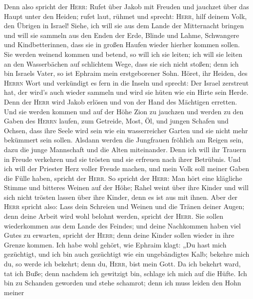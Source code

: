  Denn also spricht der \textsc{Herr}: Rufet über Jakob mit
Freuden und jauchzet über das Haupt unter den Heiden; rufet laut, rühmet
und sprecht: \textsc{Herr}, hilf deinem Volk, den Übrigen in Israel!
 Siehe, ich will sie aus dem Lande der Mitternacht bringen
und will sie sammeln aus den Enden der Erde, Blinde und Lahme,
Schwangere und Kindbetterinnen, dass sie in großen Haufen wieder hierher
kommen sollen.  Sie werden weinend kommen und betend, so
will ich sie leiten; ich will sie leiten an den Wasserbächen auf
schlichtem Wege, dass sie sich nicht stoßen; denn ich bin Israels Vater,
so ist Ephraim mein erstgeborener Sohn.  Höret, ihr
Heiden, des \textsc{Herrn} Wort und verkündigt es fern in die Inseln und
sprecht: Der Israel zerstreut hat, der wird's auch wieder sammeln und
wird sie hüten wie ein Hirte sein Herde.  Denn der
\textsc{Herr} wird Jakob erlösen und von der Hand des Mächtigen
erretten.  Und sie werden kommen und auf der Höhe Zion zu
jauchzen und werden zu den Gaben des \textsc{Herrn} laufen, zum
Getreide, Most, Öl, und jungen Schafen und Ochsen, dass ihre Seele wird
sein wie ein wasserreicher Garten und sie nicht mehr bekümmert sein
sollen.  Alsdann werden die Jungfrauen fröhlich am Reigen
sein, dazu die junge Mannschaft und die Alten miteinander. Denn ich will
ihr Trauern in Freude verkehren und sie trösten und sie erfreuen nach
ihrer Betrübnis.  Und ich will der Priester Herz voller
Freude machen, und mein Volk soll meiner Gaben die Fülle haben, spricht
der \textsc{Herr}.  So spricht der \textsc{Herr}: Man
hört eine klägliche Stimme und bitteres Weinen auf der Höhe; Rahel weint
über ihre Kinder und will sich nicht trösten lassen über ihre Kinder,
denn es ist aus mit ihnen.  Aber der \textsc{Herr}
spricht also: Lass dein Schreien und Weinen und die Tränen deiner Augen;
denn deine Arbeit wird wohl belohnt werden, spricht der \textsc{Herr}.
Sie sollen wiederkommen aus dem Lande des Feindes;  und
deine Nachkommen haben viel Gutes zu erwarten, spricht der
\textsc{Herr}; denn deine Kinder sollen wieder in ihre Grenze kommen.
 Ich habe wohl gehört, wie Ephraim klagt: „Du hast mich
gezüchtigt, und ich bin auch gezüchtigt wie ein ungebändigtes Kalb;
bekehre mich du, so werde ich bekehrt; denn du, \textsc{Herr}, bist mein
Gott.  Da ich bekehrt ward, tat ich Buße; denn nachdem
ich gewitzigt bin, schlage ich mich auf die Hüfte. Ich bin zu Schanden
geworden und stehe schamrot; denn ich muss leiden den Hohn meiner
